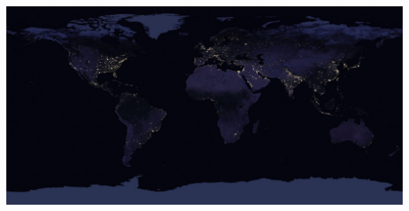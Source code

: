 \documentclass{beamer}
\begin{document}
     \begin{frame}
         \includegraphics[height=.79\textwidth,width=.99\textwidth]{img/map.jpg}
     \end{frame}
\end{document}
